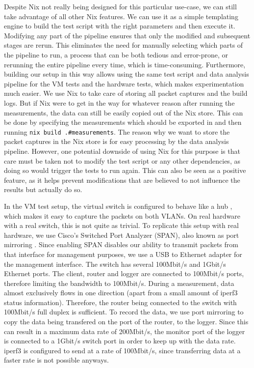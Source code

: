 Despite Nix not really being designed for this particular use-case, we can still take advantage of all other Nix features.
We can use it as a simple templating engine to build the test script with the right parameters and then execute it.
Modifying any part of the pipeline ensures that only the modified and subsequent stages are rerun.
This eliminates the need for manually selecting which parts of the pipeline to run, a process that can be both tedious and error-prone, or rerunning the entire pipeline every time, which is time-consuming.
Furthermore, building our setup in this way allows using the same test script and data analysis pipeline for the VM tests and the hardware tests, which makes experimentation much easier.
We use Nix to take care of storing all packet captures and the build logs.
But if Nix were to get in the way for whatever reason after running the measurements, the data can still be easily copied out of the Nix store.
This can be done by specifying the measurements which should be exported in  and then running \texttt{nix build .#measurements}.
The reason why we want to store the packet captures in the Nix store is for easy processing by the data analysis pipeline.
However, one potential downside of using Nix for this purpose is that care must be taken not to modify the test script or any other dependencies, as doing so would trigger the tests to run again.
This can also be seen as a positive feature, as it helps prevent modifications that are believed to not influence the results but actually do so.

In the VM test setup, the virtual switch is configured \cite{NixOS-VM-test-Hub} to behave like a hub \cite[Clause 12.4]{9844436}, which makes it easy to capture the packets on both VLANs.
On real hardware with a real switch, this is not quite as trivial.
To replicate this setup with real hardware, we use Cisco's Switched Port Analyzer (SPAN), also known as port mirroring \cite{cisco-span-tutorial}.
Since enabling SPAN disables our ability to transmit packets from that interface for management purposes, we use a USB to Ethernet adapter for the management interface.
The switch has several 100Mbit/s and 1Gbit/s Ethernet ports.
The client, router and logger are connected to 100Mbit/s ports, therefore limiting the bandwidth to 100Mbit/s.
During a measurement, data almost exclusively flows in one direction (apart from a small amount of iperf3 status information).
Therefore, the router being connected to the switch with 100Mbit/s full duplex is sufficient.
To record the data, we use port mirroring to copy the data being transfered on the port of the router, to the logger.
Since this can result in a maximum data rate of 200Mbit/s, the monitor port of the logger is connected to a 1Gbit/s switch port in order to keep up with the data rate.
iperf3 is configured to send at a rate of 100Mbit/s, since transferring data at a faster rate is not possible anyways.

